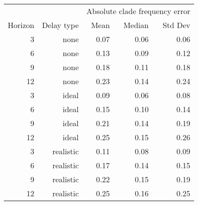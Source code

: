 
\begin{tabular*}{0.7\textwidth}{rrrrr}
\toprule
        &            & \multicolumn{3}{c}{Absolute clade frequency error} \\
Horizon & Delay type & Mean & Median & Std Dev \\
\midrule

3 & none & 0.07 & 0.06 & 0.06 \\
6 & none & 0.13 & 0.09 & 0.12 \\
9 & none & 0.18 & 0.11 & 0.18 \\
12 & none & 0.23 & 0.14 & 0.24 \\
3 & ideal & 0.09 & 0.06 & 0.08 \\
6 & ideal & 0.15 & 0.10 & 0.14 \\
9 & ideal & 0.21 & 0.14 & 0.19 \\
12 & ideal & 0.25 & 0.15 & 0.26 \\
3 & realistic & 0.11 & 0.08 & 0.09 \\
6 & realistic & 0.17 & 0.14 & 0.15 \\
9 & realistic & 0.22 & 0.15 & 0.19 \\
12 & realistic & 0.25 & 0.16 & 0.25 \\

\bottomrule
\end{tabular*}

